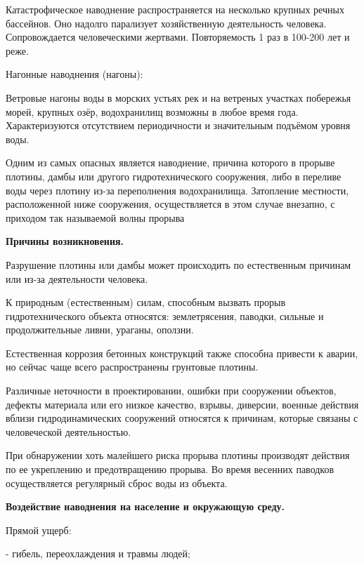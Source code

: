 \documentclass[a4paper, 12pt]{article}
\theoremstyle{definition}
\begin{document}
        Катастрофическое наводнение распространяется на несколько крупных речных бассейнов. Оно надолго парализует хозяйственную деятельность  человека. Сопровождается человеческими жертвами. Повторяемость 1 раз в 100-200 лет и реже.

        Нагонные наводнения (нагоны):

        Ветровые нагоны воды в морских устьях рек и на ветреных участках побережья морей, крупных озёр, водохранилищ возможны в любое время года. Характеризуются отсутствием периодичности и значительным подъёмом уровня воды.

        Одним из самых опасных является наводнение, причина которого в прорыве плотины, дамбы или другого гидротехнического сооружения, либо в переливе воды через плотину из-за переполнения водохранилища. Затопление местности, расположенной ниже сооружения, осуществляется в этом случае внезапно, с приходом так называемой волны прорыва 

        \begin{center}
            \textbf{Причины возникновения.} 
        \end{center}

        Разрушение плотины или дамбы может происходить
        по естественным причинам или из-за деятельности человека.

        К природным (естественным) силам, способным вызвать прорыв гидротехнического объекта относятся: землетрясения, паводки, сильные и продолжительные ливни, ураганы, оползни.

        Естественная коррозия бетонных конструкций также способна привести к аварии, но сейчас чаще всего распространены грунтовые плотины.

        Различные неточности в проектировании, ошибки при сооружении объектов, дефекты материала или его низкое качество, взрывы, диверсии, военные действия вблизи гидродинамических сооружений относятся к причинам, которые связаны с человеческой деятельностью.

        При обнаружении хоть малейшего риска прорыва плотины производят действия по ее укреплению и предотвращению прорыва. Во время весенних паводков осуществляется регулярный сброс воды из объекта. 

        \begin{center}
            \textbf{Воздействие наводнения на население и окружающую среду.} 
        \end{center}
        Прямой ущерб:

        - гибель, переохлаждения и травмы людей;
\end{document}
